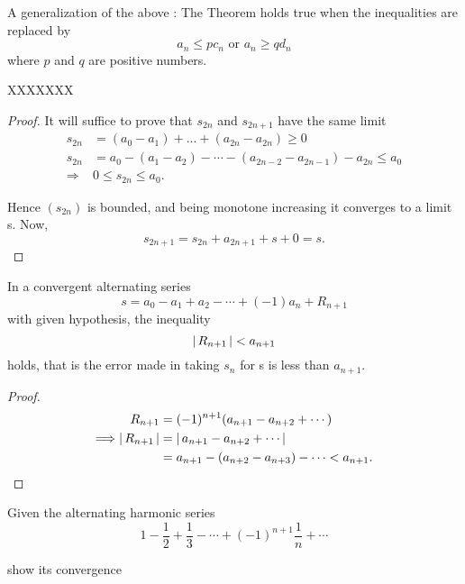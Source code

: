 \documentclass[11pt]{amsbook}
\begin{document}
A generalization of the above :
The Theorem holds true when the inequalities are replaced by
\[
	a_n \leq p  c_n \text{ or } a_n \geq q d_n
\]
where $p$ and $q$ are positive numbers.

\begin{thm}
	XXXXXXX
	\begin{proof}
		It will suffice to prove that $s_{2n}$ and $s_{2n+1}$ have the same limit
		\begin{align*}
			s_{2n} 
				&= (a_{0} - a_{1})
				+ ... +(a_{2n} - a_{2n})
				\geq 0 
				\tag{from 1}\label{myeq}\\
			s_{2n} 
				&= a_{0} 
				- (a_{1} - a_{2})
				- \dotsb
				- (a_{2n-2} - a_{2n-1})
				- a_{2n} 
				\leq a_{0} 
				\tag{from 1}\label{mye1q}\\
			\Longrightarrow 
				&0 \leq s_{2n} \leq a_{0}.
		\end{align*}
		
Hence $(s_{2n})$ is bounded, and being monotone increasing it converges to a limit s. 
Now,
		\[
			s_{2n+1} 
				= s_{2n}+a_{2n+1} + s + 0= s.
		\]
	\end{proof}
\end{thm}
\begin{cor}
	In a convergent alternating series
	\[
		s 
			= a_{0} - a_{1} + a_{2} - \dotsb + (-1) a_{n} + R_{n+1}
	\]
	with given hypothesis, the inequality
	\[
		\left \lvert \, R_{n+1} \, \right \rvert < a_{n+1}
	\]
	holds, that is the error made in taking $s_{n}$ for s is less than $a_{n+1}$.
	\begin{proof}
		\begin{align*}
			R_{n+1} 
				&= (-1)^{n+1} (a_{n+1} - a_{n+2} + \dotsb)\\
			\Longrightarrow \left \lvert \, R_{n+1} \, \right \rvert
				&= \left \lvert \,  a_{n+1} - a_{n+2} + \dotsb \, \right \rvert\\
				&= a_{n+1} - (a_{n+2} - a_{n+3}) - \dotsb < a_{n+1}.
		\end{align*}
	\end{proof}
\end{cor}
\begin{exmp}
	Given the alternating harmonic series	
	\[
		1 - \frac{1}{2} + \frac{1}{3} 
		- \dotsb 
		+ (-1)^{n+1} \frac{1}{n} 
		+ \dotsb
	\]
	\begin{hEnumerateAlpha}
		\item
		show its convergence
		
	\end{hEnumerateAlpha}
\end{exmp}
\end{document}
